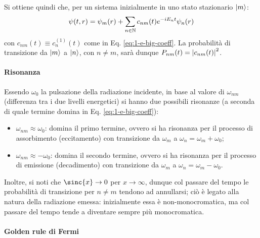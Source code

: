 Si ottiene quindi che, per un sistema inizialmente in uno stato stazionario $ \ket{m} $:
\begin{equation}
	\psi(t,r) = \psi_m(r) + \sum_{n \in \mathbb{N}} c_{nm}(t) e^{- i E_n t} \psi_n(r)
\end{equation}
con $ c_{nm}(t) \equiv c_n^{(1)}(t) $ come in Eq. \ref{eq:1-e-big-coeff}. La probabilità di transizione da $ \ket{m} $ a $ \ket{n} $, con $ n \neq m $, sarà dunque $ P_{nm}(t) = \left\lvert c_{nm}(t)\right\rvert^2 $.

\paragraph{Risonanza}

Essendo $ \omega_0 $ la pulsazione della radiazione incidente, in base al valore di $ \omega_{nm} $ (differenza tra i due livelli energetici) si hanno due possibili risonanze (a seconda di quale termine domina in Eq. \ref{eq:1-e-big-coeff}):
\begin{itemize}
	\item $ \omega_{nm} \approx \omega_0 $: domina il primo termine, ovvero si ha risonanza per il processo di assorbimento (eccitamento) con transizione da $ \omega_m $ a $ \omega_n = \omega_m + \omega_0 $;
	\item $ \omega_{nm} \approx - \omega_0 $: domina il secondo termine, ovvero si ha risonanza per il processo di emissione (decadimento) con transizione da $ \omega_m $ a $ \omega_n = \omega_m - \omega_0 $.
\end{itemize}
Inoltre, si noti che $ \sinc{x} \rightarrow 0 $ per $ x \rightarrow \infty $, dunque col passare del tempo le probabilità di transizione per $ n \neq m $ tendono ad annullarsi; ciò è legato alla natura della radiazione emessa: inizialmente essa è non-monocromatica, ma col passare del tempo tende a diventare sempre più monocromatica.

\paragraph{Golden rule di Fermi}


